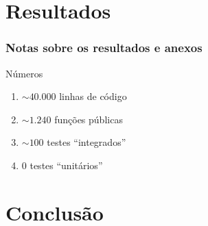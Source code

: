 \documentclass[usenames,dvipsnames]{gt-beamer}
\begin{document}


    \section{Resultados}

    \begin{frame}[allowframebreaks]
        \frametitle{Notas sobre os resultados e anexos}

        \begin{block}{Números}
            \begin{enumerate}
                \item $\sim 40.000$ linhas de código
                \item $\sim 1.240$ funções públicas
                \item $\sim 100$ testes ``integrados''
                \item $0$ testes ``unitários''
            \end{enumerate}
        \end{block}

    \end{frame}

    \section{Conclusão}
\end{document}
